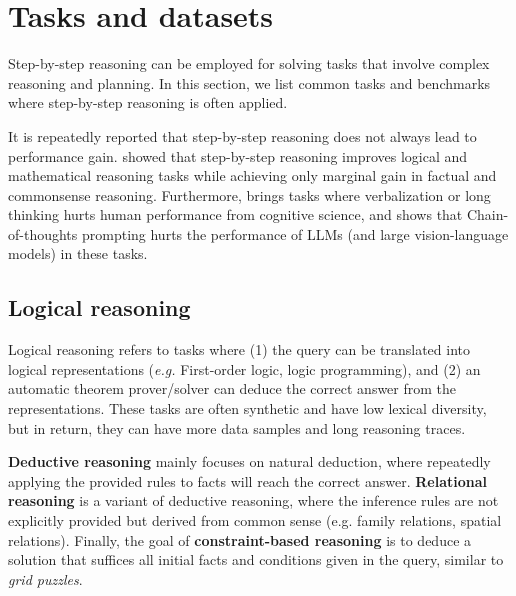 \section{Tasks and datasets}
\label{sec:task}

Step-by-step reasoning can be employed for solving tasks that involve complex reasoning and planning. In this section, we list common tasks and benchmarks where step-by-step reasoning is often applied. 

It is repeatedly reported that step-by-step reasoning does not always lead to performance gain. \citet{sprague2024cotcotchainofthoughthelps} showed that step-by-step reasoning improves logical and mathematical reasoning tasks while achieving only marginal gain in factual and commonsense reasoning. Furthermore, \citet{liu2024mindstepbystep} brings tasks where verbalization or long thinking hurts human performance from cognitive science, and shows that Chain-of-thoughts prompting hurts the performance of LLMs (and large vision-language models) in these tasks.

\subsection{Logical reasoning}

Logical reasoning refers to tasks where (1) the query can be translated into logical representations (\textit{e.g.} First-order logic, logic programming), and (2) an automatic theorem prover/solver can deduce the correct answer from the representations. These tasks are often synthetic and have low lexical diversity, but in return, they can have more data samples and long reasoning traces.

\textbf{Deductive reasoning} \citep{tafjord-etal-2021-proofwriter, tian-etal-2021-diagnosing, PrOntoQA, han-etal-2024-folio} mainly focuses on natural deduction, where repeatedly applying the provided rules to facts will reach the correct answer. \textbf{Relational reasoning} \citep{sinha-etal-2019-clutrr, stepGame2022shi} is a variant of deductive reasoning, where the inference rules are not explicitly provided but derived from common sense (e.g. family relations, spatial relations). Finally, the goal of \textbf{constraint-based reasoning} \citep{zhong2021arlsatinvestigatinganalyticalreasoning, tyagi-etal-2024-step} is to deduce a solution that suffices all initial facts and conditions given in the query, similar to \textit{grid puzzles}.


